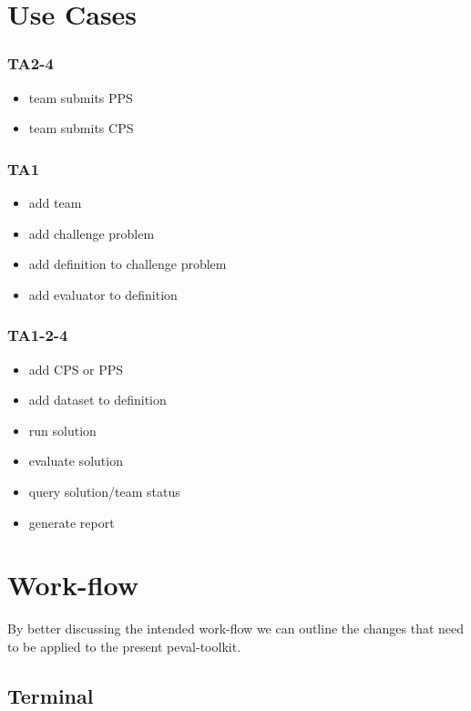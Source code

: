 \documentclass[11pt]{article} %
\def\ptk{peval-toolkit\xspace}
\newenvironment{mitemize}[1]{
  \begin{minipage}{\columnwidth}
  \subsubsection*{#1}
  \begin{itemize}
    \setlength{\topsep}{0pt}
    \setlength{\itemsep}{1pt}
    \setlength{\parsep}{0pt}
    \setlength{\parskip}{0pt}
}{\end{itemize}\end{minipage}}
\begin{document}
\section*{Use Cases}
\begin{multicols}{2}

\begin{mitemize}{TA2-4}
  \item team submits PPS
  \item team submits CPS
\end{mitemize}

\begin{mitemize}{TA1}
  \item add team
  \item add challenge problem
  \item add definition to challenge problem
  \item add evaluator to definition
\end{mitemize}

\begin{mitemize}{TA1-2-4}
  \item add CPS or PPS
  \item add dataset to definition
  \item run solution
  \item evaluate solution
  \item query solution/team status
  \item generate report
\end{mitemize}

\end{multicols}

\newpage
\section*{Work-flow}
By better discussing the intended work-flow we can outline the changes that need to be applied to the present \ptk.

\subsection*{Terminal}
\end{document}
